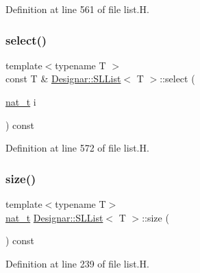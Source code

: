 Definition at line 561 of file list.\+H.

\mbox{\label{class_designar_1_1_s_l_list_abb09e0413e57c81d7605c79464808ee0}} 
\subsubsection{\texorpdfstring{select()}{select()}\hspace{0.1cm}{\footnotesize\ttfamily [2/2]}}
{\footnotesize\ttfamily template$<$typename T $>$ \\
const T \& \hyperlink{class_designar_1_1_s_l_list}{Designar\+::\+S\+L\+List}$<$ T $>$\+::select (\begin{DoxyParamCaption}\item[{\hyperlink{namespace_designar_aa72662848b9f4815e7bf31a7cf3e33d1}{nat\+\_\+t}}]{i }\end{DoxyParamCaption}) const}



Definition at line 572 of file list.\+H.

\mbox{\label{class_designar_1_1_s_l_list_a1c98e196a2e6d565efff444a590eaf49}} 
\subsubsection{\texorpdfstring{size()}{size()}}
{\footnotesize\ttfamily template$<$typename T$>$ \\
\hyperlink{namespace_designar_aa72662848b9f4815e7bf31a7cf3e33d1}{nat\+\_\+t} \hyperlink{class_designar_1_1_s_l_list}{Designar\+::\+S\+L\+List}$<$ T $>$\+::size (\begin{DoxyParamCaption}{ }\end{DoxyParamCaption}) const\hspace{0.3cm}{\ttfamily [inline]}}



Definition at line 239 of file list.\+H.

\mbox{\label{class_designar_1_1_s_l_list_a21c2c6233d40927d715827cf693b4694}} 

